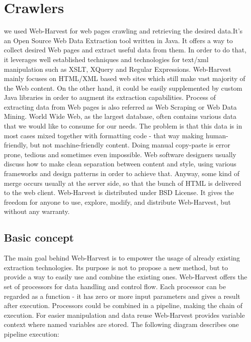 
\section{Crawlers}
we used Web-Harvest for web pages crawling and retrieving the desired data.It’s an Open Source Web Data Extraction tool written in Java. It offers a way to collect desired Web pages and extract useful data from them. In order to do that, it leverages well established techniques and technologies for text/xml manipulation such as XSLT, XQuery and Regular Expressions. Web-Harvest mainly focuses on HTML/XML based web sites which still make vast majority of the Web content. On the other hand, it could be easily supplemented by custom Java libraries in order to augment its extraction capabilities.
Process of extracting data from Web pages is also referred as Web Scraping or Web Data Mining. World Wide Web, as the largest database, often contains various data that we would like to consume for our needs. The problem is that this data is in most cases mixed together with formatting code - that way making human-friendly, but not machine-friendly content. Doing manual copy-paste is error prone, tedious and sometimes even impossible. Web software designers usually discuss how to make clean separation between content and style, using various frameworks and design patterns in order to achieve that. Anyway, some kind of merge occurs usually at the server side, so that the bunch of HTML is delivered to the web client.
Web-Harvest is distributed under BSD License. It gives the freedom for anyone to use, explore, modify, and distribute Web-Harvest, but without any warranty. 
\subsection{Basic concept}
The main goal behind Web-Harvest is to empower the usage of already existing extraction technologies. Its purpose is not to propose a new method, but to provide a way to easily use and combine the existing ones. Web-Harvest offers the set of processors for data handling and control flow. Each processor can be regarded as a function - it has zero or more input parameters and gives a result after execution. Processors could be combined in a pipeline, making the chain of execution. For easier manipulation and data reuse Web-Harvest provides variable context where named variables are stored. The following diagram describes one pipeline execution:

